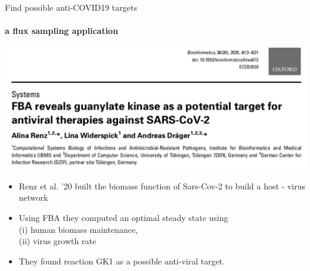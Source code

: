 \documentclass{beamer}
\begin{document}
   \begin{frame}{Find possible anti-COVID19 targets}
      \framesubtitle{a flux sampling application}
      \bigskip
      \includegraphics[scale=0.27]{../resources/covid_paper.png}
      
      \begin{singlespace}
         \begin{itemize}
            \item \small Renz et al. '20 built the biomass function of Sars-Cov-2 to build a host - virus network
            \item \small Using FBA they computed an optimal steady state using \\ \small \quad (i) human biomass maintenance,\\ \small \quad (ii) virus growth rate
            \item \small They found reaction GK1 as a possible anti-viral target.
         \end{itemize}            
      \end{singlespace}

   \end{frame}
\end{document}
